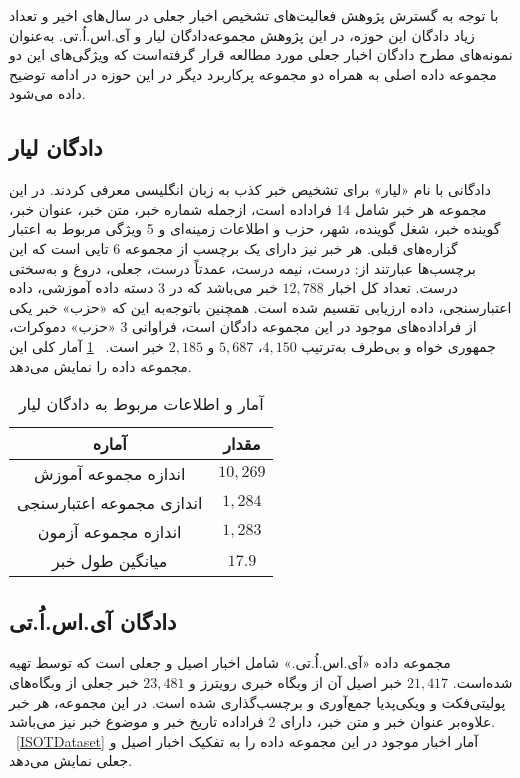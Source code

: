با توجه به گسترش پژوهش فعالیت‌های تشخیص اخبار جعلی در سال‌های اخیر و تعداد زیاد دادگان این حوزه، در این پژوهش مجموعه‌دادگان لیار و آی.اس.اُ.تی. به‌عنوان نمونه‌های مطرح دادگان اخبار جعلی مورد مطالعه قرار گرفته‌است که ویژگی‌های این دو مجموعه داده اصلی به همراه دو مجموعه پرکاربرد دیگر در این حوزه در ادامه توضیح داده می‌شود.

\subsection{دادگان لیار}

\noindent \citet{wang2017liar} دادگانی با نام «لیار» برای تشخیص خبر کذب به زبان انگلیسی معرفی کردند. در این مجموعه هر خبر شامل 14 فراداده است، ازجمله شماره خبر، متن خبر، عنوان خبر، گوینده خبر، شغل گوینده، شهر، حزب و اطلاعات زمینه‌ای و 5 ویژگی مربوط به اعتبار گزاره‌های قبلی. هر خبر نیز دارای یک برچسب از مجموعه 6 تایی است که این برچسب‌ها عبارتند از: درست، نیمه درست، عمدتاً درست، جعلی، دروغ و به‌سختی درست. تعداد کل اخبار $12,788$ خبر می‌باشد که در 3 دسته داده آموزشی، داده اعتبارسنجی، داده ارزیابی تقسیم شده‌ است. همچنین باتوجه‌به این که «حزب» خبر یکی از فراداده‌های موجود در این مجموعه دادگان است، فراوانی 3 «حزب» دموکرات، جمهوری خواه و بی‌طرف به‌ترتیب 
$4,150$، $5,687$ و $2,185$ 
خبر است.
\tablename~\ref{liarDataset} آمار کلی این مجموعه داده را نمایش می‌دهد.

\begin{table}[!h]
\caption{آمار و اطلاعات مربوط به دادگان لیار}
\label{liarDataset}
\begin{center}
\begin{tabular}{|c|c|}
\hline
\textbf{آماره} & \textbf{مقدار} \\
\hline
\hline
اندازه مجموعه آموزش
&   $10,269$  \\
\hline
 اندازی مجموعه اعتبارسنجی
 & $1,284$  \\
\hline
  اندازه مجموعه آزمون
  & $1,283$ \\
\hline
 میانگین طول خبر
 & $17.9$  \\
\hline

\end{tabular}
\end{center}
\end{table}


\subsection{دادگان آی.اس.اُ.تی}
مجموعه داده «آی.اس.اُ.تی.» شامل اخبار اصیل و جعلی است که توسط \citet{ahmed2017detection} تهیه شده‌است.
$21,417$ خبر اصیل آن از وبگاه خبری رویترز و $23,481$ خبر جعلی از وبگاه‌های پولیتی‌فکت و ویکی‌پدیا جمع‌آوری و برچسب‌گذاری شده‌ است. در این مجموعه، هر خبر علاوه‌بر عنوان خبر و متن خبر، دارای 2  فراداده تاریخ خبر و موضوع خبر نیز 
می‌باشد. \tablename~\ref{ISOTDataset} آمار اخبار موجود در این مجموعه داده را به تفکیک اخبار اصیل و جعلی نمایش می‌دهد.

